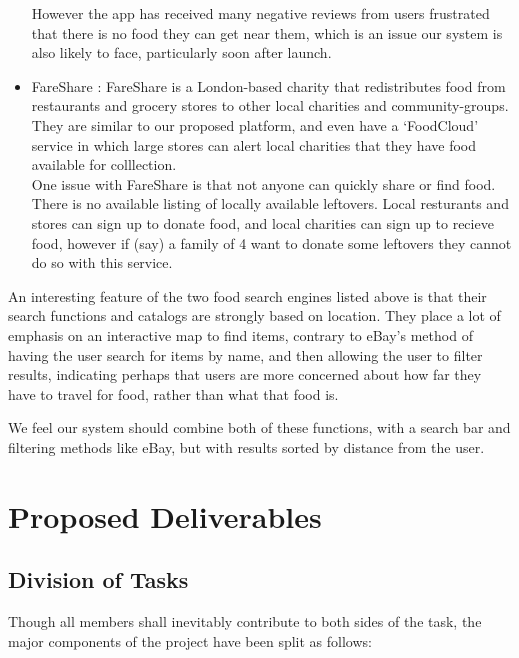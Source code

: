 \documentclass[12pt]{article}
\begin{document}
\begin{itemize}
        However the app has received many negative reviews from users frustrated
        that there is no food they can get near them, which is an issue our
        system is also likely to face, particularly soon after launch.
        
    \item FareShare \cite{fareshare}:
		FareShare is a London-based charity that redistributes food from restaurants
		and grocery stores to other local charities and community-groups. They are similar
		to our proposed platform, and even have a `FoodCloud' service in which large stores
		can alert local charities that they have food available for colllection.\\
		One issue with FareShare is that not anyone can quickly share or find food. There is no available listing of locally available leftovers.
		Local resturants and stores can sign up to donate food, and local charities can sign up to recieve food, however
		if (say) a family of 4 want to donate some leftovers they cannot do so with this service.
\end{itemize}

An interesting feature of the two food search engines listed above is that
their search functions and catalogs are strongly based on location.
They place a lot of emphasis on an interactive map to find items, contrary to
eBay’s method of having the user search for items by name, and then allowing
the user to filter results, indicating perhaps that users are more concerned
about how far they have to travel for food, rather than what that food is.

We feel our system should combine both of these functions, with a search bar
and filtering methods like eBay, but with results sorted by distance from the user.

\pagebreak

\section{Proposed Deliverables}
\subsection{Division of Tasks}

Though all members shall inevitably contribute to both sides of the task,
the major components of the project have been split as follows:
\end{document}
